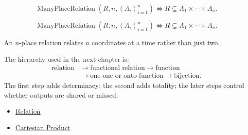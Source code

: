 \begin{remark*}
\[
  \operatorname{ManyPlaceRelation}(R,n,(A_i)_{i=1}^n)
  \iff
  R\subseteq A_1\times\cdots\times A_n.
\]
\end{remark*}

\begin{remark*}
\[
  \operatorname{ManyPlaceRelation}(R,n,(A_i)_{i=1}^n)
  \iff
  R\subseteq A_1\times\cdots\times A_n.
\]
\end{remark*}

\begin{remark*}[Interpretation]
An $n$-place relation relates $n$ coordinates at a time rather than just two.
\end{remark*}

\begin{remark*}[Exposition]
The hierarchy used in the next chapter is:
\[
\begin{aligned}
\text{relation}
&\longrightarrow
\text{functional relation}
\longrightarrow
\text{function} \\
&\longrightarrow
\text{one-one or onto function}
\longrightarrow
\text{bijection}.
\end{aligned}
\]
The first step adds determinacy; the second adds totality; the later steps
control whether outputs are shared or missed.
\end{remark*}

\begin{dependencies}
\begin{itemize}
  \item \hyperref[def:relation]{Relation}
  \item \hyperref[def:cartesian-product-rel]{Cartesian Product}
\end{itemize}
\end{dependencies}
